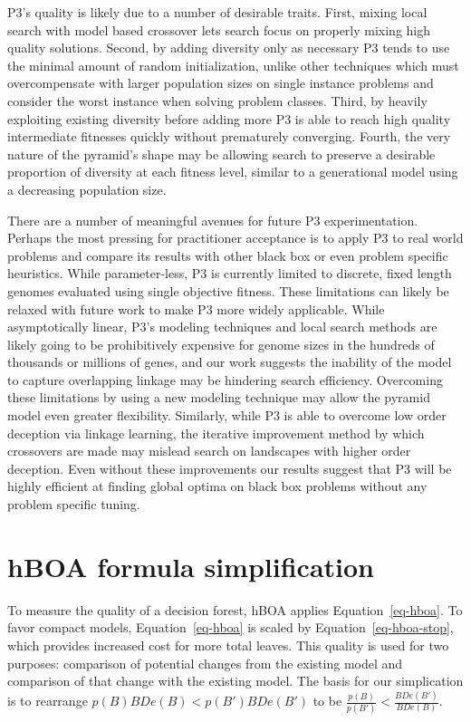 \documentclass[twoside]{article}
\begin{document}
P3's quality is likely due to a number of desirable traits. First, mixing local search with model based
crossover lets search focus on properly mixing high quality solutions. Second, by adding diversity only
as necessary P3 tends to use the minimal amount of random initialization, unlike other techniques which must
overcompensate with larger population sizes on single instance problems and consider the worst instance
when solving problem classes. Third, by heavily exploiting existing diversity before adding more P3 is able
to reach high quality intermediate fitnesses quickly without prematurely converging. Fourth, the very
nature of the pyramid's shape may be allowing search to preserve a desirable proportion of diversity at
each fitness level, similar to a generational model using a decreasing population size.

There are a number of meaningful avenues for future P3 experimentation. Perhaps the most
pressing for practitioner acceptance is to apply P3 to real world problems and compare
its results with other black box or even problem specific heuristics. While parameter-less,
P3 is currently limited to discrete, fixed length genomes evaluated using single objective
fitness. These limitations can likely be relaxed with future work to make P3 more widely applicable.
While asymptotically linear, P3's modeling techniques and local search methods are likely going
to be prohibitively expensive for genome sizes in the hundreds of thousands or millions of genes,
and our work suggests the inability of the model to capture overlapping linkage may be hindering
search efficiency. Overcoming these limitations by using a new modeling technique may allow
the pyramid model even greater flexibility. Similarly, while P3 is able to overcome low
order deception via linkage learning, the iterative improvement method by which crossovers
are made may mislead search on landscapes with higher order deception. Even without
these improvements our results suggest that P3 will be highly efficient at finding
global optima on black box problems without any problem specific tuning.

\small




\appendix
\section{hBOA formula simplification}
\label{sec-appendix}
To measure the quality of a decision forest, hBOA applies Equation~\ref{eq-hboa}.
To favor compact
models, Equation~\ref{eq-hboa} is scaled by Equation~\ref{eq-hboa-stop}, which provides increased cost
for more total leaves.
This quality is used for two purposes: comparison of potential changes from the existing model
and comparison of that change with the existing model. The basis for our simplication
is to rearrange $p(B)BDe(B) < p(B')BDe(B')$ to be $\frac{p(B)}{p(B')} < \frac{BDe(B')}{BDe(B)}$.
\end{document}
